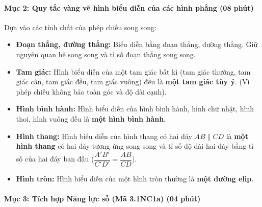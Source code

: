 \documentclass[12pt, a4paper]{article}
\begin{document}
\paragraph{Mục 2: Quy tắc vàng vẽ hình biểu diễn của các hình phẳng (08 phút)}
Dựa vào các tính chất của phép chiếu song song:
\begin{itemize}
    \item \textbf{Đoạn thẳng, đường thẳng:} Biểu diễn bằng đoạn thẳng, đường thẳng. Giữ nguyên quan hệ song song và tỉ số đoạn thẳng song song.
    \item \textbf{Tam giác:} Hình biểu diễn của một tam giác bất kì (tam giác thường, tam giác cân, tam giác đều, tam giác vuông) đều là \textbf{một tam giác tùy ý}. (Vì phép chiếu không bảo toàn góc và độ dài cạnh).
    \item \textbf{Hình bình hành:} Hình biểu diễn của hình bình hành, hình chữ nhật, hình thoi, hình vuông đều là \textbf{một hình bình hành}.
    \item \textbf{Hình thang:} Hình biểu diễn của hình thang có hai đáy $AB \parallel CD$ là \textbf{một hình thang} có hai đáy tương ứng song song và tỉ số độ dài hai đáy bằng tỉ số của hai đáy ban đầu ($\dfrac{A'B'}{C'D'} = \dfrac{AB}{CD}$).
    \item \textbf{Hình tròn:} Hình biểu diễn của một hình tròn thường là \textbf{một đường elip}.
\end{itemize}

\begin{center}
\end{center}

\paragraph{Mục 3: Tích hợp Năng lực số (Mã 3.1NC1a) (04 phút)}
\end{document}
